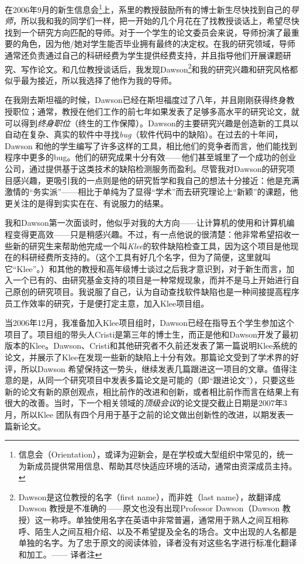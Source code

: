 \documentclass[letter,12pt]{book}
\begin{document}
\begin{CJK}{UTF8}{gbsn}
在2006年9月的新生信息会\footnote{信息会（Orientation），或译为迎新会，是在学校或大型组织中常见的，统一为新成员提供常用信息、帮助其尽快适应环境的活动，通常由资深成员主持。}上，系里的教授鼓励所有的博士新生尽快找到自己的\emph{导师}，所以我和我的同学们一样，把一开始的几个月花在了找教授谈话上，希望尽快找到一个研究方向匹配的导师。对于一个学生的论文委员会来说，导师扮演了最重要的角色，因为他/她对学生能否毕业拥有最终的决定权。在我的研究领域，导师通常还负责通过自己的科研经费为学生提供经费支持，并且指导他们开展课题研究、写作论文。和几位教授谈话后，我发现Dawson\footnote{Dawson是这位教授的名字（first name），而非姓（last name），故翻译成Dawson 教授是不准确的——原文也没有出现Professor Dawson（Dawson 教授）这一称呼。单独使用名字在英语中非常普遍，通常用于熟人之间互相称呼、陌生人之间互相介绍、以及不希望提及全名的场合。文中出现的人名都是单独的名字。为了忠于原文的阅读体验，译者没有对这些名字进行标准化翻译和加工。—— 译者注}和我的研究兴趣和研究风格都似乎最为接近，所以我选择了他作为我的导师。

在我刚去斯坦福的时候，Dawson已经在斯坦福度过了八年，并且刚刚获得终身教授职位；通常，教授在他们工作的前七年如果发表了足够多高水平的研究论文，就可以得到\emph{终身职位}（终生的工作保障）。Dawson的主要研究兴趣是创造新的工具以自动在复杂、真实的软件中寻找\emph{bug}（软件代码中的缺陷）。在过去的十年间，Dawson 和他的学生编写了许多这样的工具，相比他们的竞争者而言，他们能找到程序中更多的bug。他们的研究成果十分有效——他们甚至城里了一个成功的创业公司，通过提供基于这类技术的缺陷检测服务而盈利。尽管我对Dawson的研究项目感兴趣，更吸引我的一点则是他的研究哲学和我自己的想法十分接近：他是充满激情的“务实派”——相比于单纯为了显得“学术”而去研究理论上“新颖”的课题，他更关注的是得到实实在在、有说服力的结果。

我和Dawson第一次面谈时，他似乎对我的大方向——让计算机的使用和计算机编程变得更高效——只是稍感兴趣。不过，有一点他说的很清楚：他非常希望招收一些新的研究生来帮助他完成一个叫\emph{Klee}的软件缺陷检查工具，因为这个项目是他现在的科研经费所支持的。（这个工具有好几个名字，但为了简便，这里就叫它“Klee”。）和其他的教授和高年级博士谈过之后我才意识到，对于新生而言，加入一个已有的、由研究基金支持的项目是一种常规现象，而并不是马上开始进行自己原创的研究项目。我说服了自己，认为自动查找软件缺陷也是一种间接提高程序员工作效率的研究，于是便打定主意，加入Klee项目组。

当2006年12月，我准备加入Klee项目组时，Dawson已经在指导五个学生参加这个项目了。项目组的带头人Cristi是第三年的博士生，而正是他和Dawson开发了最初版本的Klee。Dawson、Cristi和其他研究者不久前还发表了第一篇说明Klee系统的论文，并展示了Klee在发现一些新的缺陷上十分有效。那篇论文受到了学术界的好评，所以Dawson 希望保持这一势头，继续发表几篇跟进这一项目的文章。值得注意的是，从同一个研究项目中发表多篇论文是可能的（即“跟进论文”），只要这些新的论文有新的原创观点，相比前作的改进和创新，或者相比前作而言在结果上有很大的改善。当时，下一个相关领域的\emph{顶级会议}的论文提交截止日期是2007年3月，所以Klee 团队有四个月用于基于之前的论文做出创新性的改进，以期发表一篇新论文。


\end{CJK}
\end{document}
